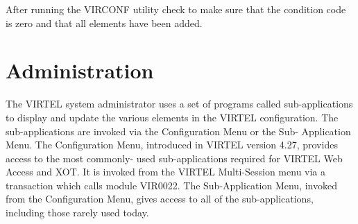 \documentclass[letterpaper,10pt,english]{sphinxmanual}
\begin{document}
\begin{sphinxVerbatim}[commandchars=\\\{\}]
                                                     
                             
                                                        
                                                      
                                                          
                                                            
                                                   
                                                       
                                                           
                                                         
                                                         
\end{sphinxVerbatim}


After running the VIRCONF utility check to make sure that the condition code is zero and that all elements have been added.

\newpage

\ignorespaces 

\section{Administration}
\label{\detokenize{connectivity_guide:administration}}\label{\detokenize{connectivity_guide:index-0}}
The VIRTEL system administrator uses a set of programs called sub-applications to display and update the various elements in the VIRTEL configuration. The sub-applications are invoked via the Configuration Menu or the Sub- Application Menu. The Configuration Menu, introduced in VIRTEL version 4.27, provides access to the most commonly- used sub-applications required for VIRTEL Web Access and XOT. It is invoked from the VIRTEL Multi-Session menu via a transaction which calls module VIR0022. The Sub-Application Menu,
invoked from the Configuration Menu, gives access to all of the sub-applications, including those rarely used today.
\end{document}
